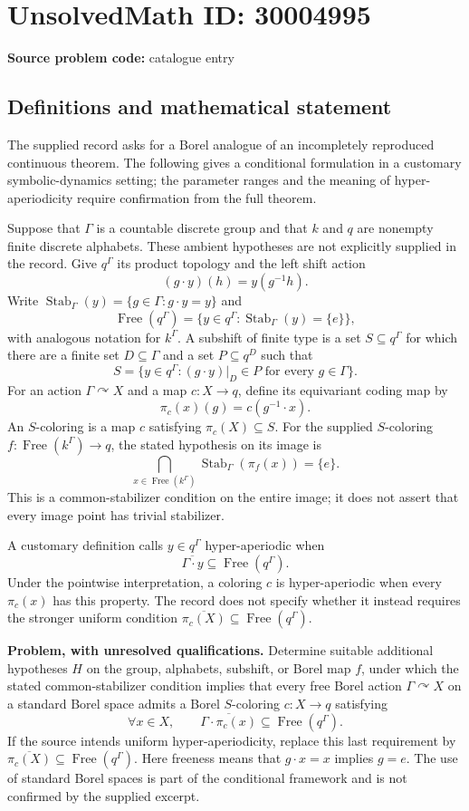 \documentclass[11pt]{article}
\begin{document}
\section*{UnsolvedMath ID: 30004995}
\textbf{Source problem code:} catalogue entry
\subsection{Definitions and mathematical statement}
The supplied record asks for a Borel analogue of an incompletely reproduced continuous theorem. The following gives a conditional formulation in a customary symbolic-dynamics setting; the parameter ranges and the meaning of hyper-aperiodicity require confirmation from the full theorem.

Suppose that \(\Gamma\) is a countable discrete group and that \(k\) and \(q\) are nonempty finite discrete alphabets. These ambient hypotheses are not explicitly supplied in the record. Give \(q^\Gamma\) its product topology and the left shift action
\[
(g\cdot y)(h)=y(g^{-1}h).
\]
Write \(\operatorname{Stab}_\Gamma(y)=\{g\in\Gamma:g\cdot y=y\}\) and
\[
\operatorname{Free}(q^\Gamma)=\{y\in q^\Gamma:\operatorname{Stab}_\Gamma(y)=\{e\}\},
\]
with analogous notation for \(k^\Gamma\). A subshift of finite type is a set \(S\subseteq q^\Gamma\) for which there are a finite set \(D\subseteq\Gamma\) and a set \(P\subseteq q^D\) such that
\[
S=\{y\in q^\Gamma:(g\cdot y)|_D\in P\text{ for every }g\in\Gamma\}.
\]
For an action \(\Gamma\curvearrowright X\) and a map \(c:X\to q\), define its equivariant coding map by
\[
\pi_c(x)(g)=c(g^{-1}\cdot x).
\]
An \(S\)-coloring is a map \(c\) satisfying \(\pi_c(X)\subseteq S\). For the supplied \(S\)-coloring \(f:\operatorname{Free}(k^\Gamma)\to q\), the stated hypothesis on its image is
\[
\bigcap_{x\in\operatorname{Free}(k^\Gamma)}\operatorname{Stab}_\Gamma(\pi_f(x))=\{e\}.
\]
This is a common-stabilizer condition on the entire image; it does not assert that every image point has trivial stabilizer.

A customary definition calls \(y\in q^\Gamma\) hyper-aperiodic when
\[
\overline{\Gamma\cdot y}\subseteq\operatorname{Free}(q^\Gamma).
\]
Under the pointwise interpretation, a coloring \(c\) is hyper-aperiodic when every \(\pi_c(x)\) has this property. The record does not specify whether it instead requires the stronger uniform condition \(\overline{\pi_c(X)}\subseteq\operatorname{Free}(q^\Gamma)\).

\textbf{Problem, with unresolved qualifications.} Determine suitable additional hypotheses \(H\) on the group, alphabets, subshift, or Borel map \(f\), under which the stated common-stabilizer condition implies that every free Borel action \(\Gamma\curvearrowright X\) on a standard Borel space admits a Borel \(S\)-coloring \(c:X\to q\) satisfying
\[
\forall x\in X,\qquad
\overline{\Gamma\cdot\pi_c(x)}\subseteq\operatorname{Free}(q^\Gamma).
\]
If the source intends uniform hyper-aperiodicity, replace this last requirement by \(\overline{\pi_c(X)}\subseteq\operatorname{Free}(q^\Gamma)\). Here freeness means that \(g\cdot x=x\) implies \(g=e\). The use of standard Borel spaces is part of the conditional framework and is not confirmed by the supplied excerpt.
\end{document}
